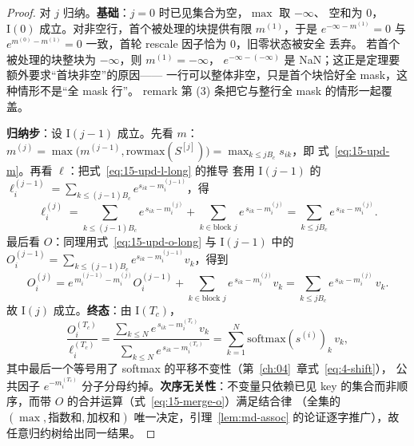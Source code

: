 \begin{proof}
  对 $j$ 归纳。\textbf{基础}：$j = 0$ 时已见集合为空，$\max$ 取 $-\infty$、
  空和为 $0$，$\mathrm{I}(0)$ 成立。对非空行，首个被处理的块提供有限
  $m^{(1)}$，于是 $e^{-\infty - m^{(1)}} = 0$ 与
  $e^{m^{(0)} - m^{(1)}} = 0$ 一致，首轮 rescale 因子恰为 $0$，旧零状态被安全
  丢弃。  若首个被处理的块整块为 $-\infty$，则 $m^{(1)} = -\infty$，
  $e^{-\infty-(-\infty)}$ 是 NaN；这正是定理要额外要求“首块非空”的原因——
  一行可以整体非空，只是首个块恰好全 mask，这种情形不是“全 mask 行”。
  remark 第 (3) 条把它与整行全 mask 的情形一起覆盖。

  \textbf{归纳步}：设 $\mathrm{I}(j{-}1)$ 成立。先看 $m$：$m^{(j)} = \max\bigl(
  m^{(j-1)}, \mathrm{rowmax}(S^{[j]})\bigr) = \max_{k \le jB_c} s_{ik}$，即
  式~\ref{eq:15-upd-m}。再看 $\ell$：把式~\ref{eq:15-upd-l-long} 的推导
  套用 $\mathrm{I}(j{-}1)$ 的 $\ell^{(j-1)}_i = \sum_{k \le (j-1)B_c}
  e^{s_{ik} - m^{(j-1)}_i}$，得
  \begin{equation*}
    \ell^{(j)}_i = \sum_{k \le (j{-}1)B_c} e^{\,s_{ik} - m^{(j)}_i}
    + \sum_{k \in \text{block } j} e^{\,s_{ik} - m^{(j)}_i}
    = \sum_{k \le jB_c} e^{\,s_{ik} - m^{(j)}_i} .
  \end{equation*}
  最后看 $O$：同理用式~\ref{eq:15-upd-o-long} 与 $\mathrm{I}(j{-}1)$ 中的
  $O^{(j-1)}_i = \sum_{k \le (j-1)B_c} e^{s_{ik} - m^{(j-1)}_i} v_k$，得到
  \begin{equation*}
    O^{(j)}_i = e^{\,m^{(j-1)}_i - m^{(j)}_i} O^{(j-1)}_i
    + \sum_{k \in \text{block } j} e^{\,s_{ik} - m^{(j)}_i} v_k
    = \sum_{k \le jB_c} e^{\,s_{ik} - m^{(j)}_i}\, v_k .
  \end{equation*}
  故 $\mathrm{I}(j)$ 成立。\textbf{终态}：由 $\mathrm{I}(T_c)$，
  \begin{equation*}
    \frac{O^{(T_c)}_i}{\ell^{(T_c)}_i}
    = \frac{\sum_{k \le N} e^{\,s_{ik} - m^{(T_c)}_i} v_k}
           {\sum_{k \le N} e^{\,s_{ik} - m^{(T_c)}_i}}
    = \sum_{k=1}^{N} \mathrm{softmax}(s^{(i)})_k\, v_k ,
  \end{equation*}
  其中最后一个等号用了 softmax 的平移不变性（第~\ref{ch:04}~章式~\ref{eq:4-shift}），
  公共因子 $e^{-m^{(T_c)}_i}$ 分子分母约掉。\textbf{次序无关性}：不变量只依赖已见
  key 的集合而非顺序，而带 $O$ 的合并运算（式~\ref{eq:15-merge-o}）满足结合律
  （全集的 $(\max, \text{指数和}, \text{加权和})$ 唯一决定，引理~\ref{lem:md-assoc}
  的论证逐字推广），故任意归约树给出同一结果。
\end{proof}

